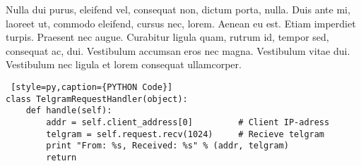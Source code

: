 Nulla dui purus, eleifend vel, consequat non, dictum porta, nulla. Duis ante mi, laoreet ut, commodo eleifend, cursus nec, lorem. Aenean eu est. Etiam imperdiet turpis. Praesent nec augue. Curabitur ligula quam, rutrum id, tempor sed, consequat ac, dui. Vestibulum accumsan eros nec magna. Vestibulum vitae dui. Vestibulum nec ligula et lorem consequat ullamcorper.

\begin{lstlisting} [style=py,caption={PYTHON Code}]
class TelgramRequestHandler(object):
    def handle(self):
        addr = self.client_address[0]         # Client IP-adress
        telgram = self.request.recv(1024)     # Recieve telgram
        print "From: %s, Received: %s" % (addr, telgram)
        return
\end{lstlisting}
